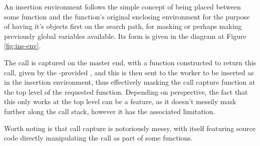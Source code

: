 \documentclass[a4paper, 10pt]{article}
\begin{document}
An insertion environment follows the simple concept of being placed between some function and the function's original enclosing environment for the purpose of having it's objects first on the search path, for masking or perhaps making previously global variables available.
Its form is given in the diagram at Figure \ref{fig:ins-env}.

The call is captured on the master end, with a function constructed to return this call, given by the \lsr{}-provided , and this is then sent to the worker to be inserted as  in the insertion environment, thus effectively masking the call capture function at the top level of the requested  function.
Depending on perspective, the fact that this only works at the top level can be a feature, as it doesn't messily mask further along the call stack, however it has the associated limitation.

Worth noting is that call capture is notoriously messy, with  itself featuring source code directly manipulating the call as part of some functions.

\end{document}
